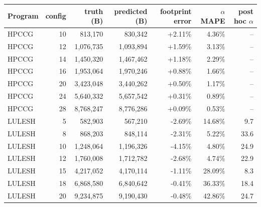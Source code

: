 \begin{tabular}{lrrrrrr}
\toprule
Program & config & truth (B) & predicted (B) & footprint error & $\alpha$ MAPE & post hoc $\alpha$ \\
\midrule
HPCCG & 10 & 813,170 & 830,342 & +2.11\% & 4.36\% & -- \\
HPCCG & 12 & 1,076,735 & 1,093,894 & +1.59\% & 3.13\% & -- \\
HPCCG & 14 & 1,450,320 & 1,467,462 & +1.18\% & 2.29\% & -- \\
HPCCG & 16 & 1,953,064 & 1,970,246 & +0.88\% & 1.66\% & -- \\
HPCCG & 20 & 3,423,048 & 3,440,262 & +0.50\% & 1.17\% & -- \\
HPCCG & 24 & 5,640,332 & 5,657,542 & +0.31\% & 0.89\% & -- \\
HPCCG & 28 & 8,768,247 & 8,776,286 & +0.09\% & 0.53\% & -- \\
\addlinespace
LULESH & 5 & 582,903 & 567,210 & -2.69\% & 14.68\% & 9.7 \\
LULESH & 8 & 868,203 & 848,114 & -2.31\% & 5.22\% & 33.6 \\
LULESH & 10 & 1,248,064 & 1,196,326 & -4.15\% & 4.80\% & 24.9 \\
LULESH & 12 & 1,760,008 & 1,712,782 & -2.68\% & 4.74\% & 22.9 \\
LULESH & 15 & 4,217,052 & 4,170,114 & -1.11\% & 28.09\% & 8.3 \\
LULESH & 18 & 6,868,580 & 6,840,642 & -0.41\% & 36.33\% & 18.4 \\
LULESH & 20 & 9,234,875 & 9,190,430 & -0.48\% & 42.86\% & 24.7 \\
\bottomrule
\end{tabular}

